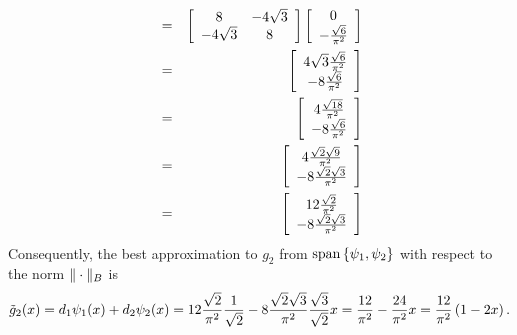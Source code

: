 \begin{solution}
\begin{enumerate}
\begin{eqnarray*}
\\
&=&\left[\begin{array}{cc} 8 & -4\sqrt{3} \\ -4\sqrt{3} & 8\end{array}\right]\left[\begin{array}{c}0 \\ -{\sqrt{6}\over \pi^2}\end{array}\right]
\\
&=&\left[\begin{array}{c}4\sqrt{3}{\sqrt{6}\over \pi^2}\\-8{\sqrt{6}\over \pi^2}\end{array}\right]
\\
&=&\left[\begin{array}{c}4{\sqrt{18}\over \pi^2}\\-8{\sqrt{6}\over \pi^2}\end{array}\right]
\\
&=&\left[\begin{array}{c}4{\sqrt{2}\sqrt{9}\over \pi^2}\\-8{\sqrt{2}\sqrt{3}\over \pi^2}\end{array}\right]
\\
&=&\left[\begin{array}{c}12{\sqrt{2}\over \pi^2}\\-8{\sqrt{2}\sqrt{3}\over \pi^2}\end{array}\right]
\end{eqnarray*}
Consequently, the best approximation to $g_2$ from ${\rm span}\left\{\psi_1,\psi_2\right\}$ with respect to the norm $\|\cdot\|_B$ is
\[
\tilde{g}_2(x)=d_1\psi_1(x)+d_2\psi_2(x)=12{\sqrt{2}\over \pi^2}{1\over\sqrt{2}}-8{\sqrt{2}\sqrt{3}\over \pi^2}{\sqrt{3}\over\sqrt{2}}x={12\over \pi^2}-{24\over \pi^2}x={12\over \pi^2}\left(1-2x\right).
\]
\end{enumerate} 
\end{solution}